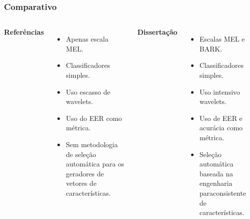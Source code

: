 \begin{frame}
	\frametitle{Comparativo}
		\begin{columns}
				\par \textbf{Referências}
				\begin{itemize}
					\item Apenas escala MEL.
					\item Classificadores simples.
					\item Uso escasso de wavelets.
					\item Uso do EER como métrica.
					\item Sem metodologia de seleção automática para os geradores de vetores de características.
				\end{itemize}
				\par \textbf{Dissertação}
				\begin{itemize}
					\item Escalas MEL e BARK.
					\item Classificadores simples.
					\item Uso intensivo wavelets.
					\item Uso de EER e acurácia como métrica.
					\item Seleção automática baseada na engenharia paraconsistente de características.
				\end{itemize}
		\end{columns}
\end{frame}